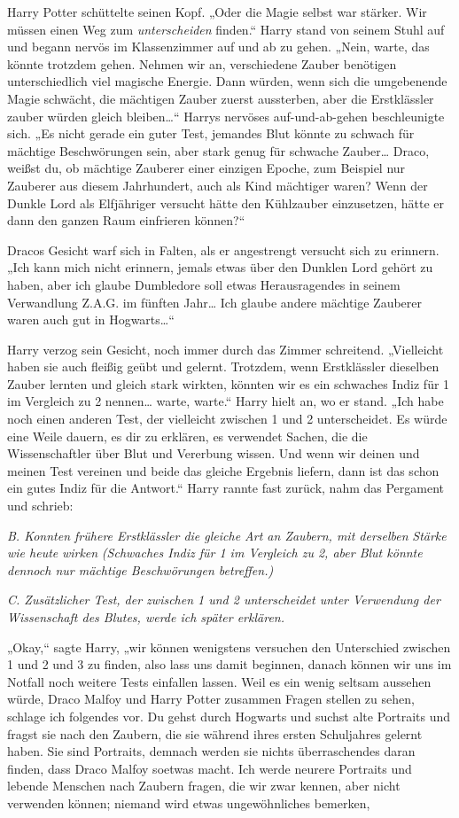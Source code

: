 {Harry Potter schüttelte seinen Kopf. „Oder die Magie selbst war stärker. Wir müssen einen Weg zum \emph{unterscheiden} finden.“ Harry stand von seinem Stuhl auf und begann nervös im Klassenzimmer auf und ab zu gehen. „Nein, warte, das könnte trotzdem gehen. Nehmen wir an, verschiedene Zauber benötigen unterschiedlich viel magische Energie. Dann würden, wenn sich die umgebenende Magie schwächt, die mächtigen Zauber zuerst aussterben, aber die Erstklässler zauber würden gleich bleiben…“ Harrys nervöses auf-und-ab-gehen beschleunigte sich. „Es nicht gerade ein guter Test, jemandes Blut könnte zu schwach für mächtige Beschwörungen sein, aber stark genug für schwache Zauber… Draco, weißst du, ob mächtige Zauberer einer einzigen Epoche, zum Beispiel nur Zauberer aus diesem Jahrhundert, auch als Kind mächtiger waren? Wenn der Dunkle Lord als Elfjähriger versucht hätte den Kühlzauber einzusetzen, hätte er dann den ganzen Raum einfrieren können?“

Dracos Gesicht warf sich in Falten, als er angestrengt versucht sich zu erinnern. „Ich kann mich nicht erinnern, jemals etwas über den Dunklen Lord gehört zu haben, aber ich glaube Dumbledore soll etwas Herausragendes in seinem Verwandlung Z.A.G. im fünften Jahr… Ich glaube andere mächtige Zauberer waren auch gut in Hogwarts…“

Harry verzog sein Gesicht, noch immer durch das Zimmer schreitend. „Vielleicht haben sie auch fleißig geübt und gelernt. Trotzdem, wenn Erstklässler dieselben Zauber lernten und gleich stark wirkten, könnten wir es ein schwaches Indiz für 1 im Vergleich zu 2 nennen… warte, warte.“ Harry hielt an, wo er stand. „Ich habe noch einen anderen Test, der vielleicht zwischen 1 und 2 unterscheidet. Es würde eine Weile dauern, es dir zu erklären, es verwendet Sachen, die die Wissenschaftler über Blut und Vererbung wissen. Und wenn wir deinen und meinen Test vereinen und beide das gleiche Ergebnis liefern, dann ist das schon ein gutes Indiz für die Antwort.“ Harry rannte fast zurück, nahm das Pergament und schrieb:

\emph{B. Konnten frühere Erstklässler die gleiche Art an Zaubern, mit derselben} \emph{Stärke wie heute} \emph{wirken} \emph{(Schwaches Indiz für 1 im Vergleich zu 2, aber Blut könnte dennoch nur mächtige Beschwörungen betreffen.)}

\emph{C. Zusätzlicher Test, der zwischen 1 und 2 unterscheidet unter Verwendung der Wissenschaft des Blutes, werde ich später erklären.}

„Okay,“ sagte Harry, „wir können wenigstens versuchen den Unterschied zwischen 1 und 2 und 3 zu finden, also lass uns damit beginnen, danach können wir uns im Notfall noch weitere Tests einfallen lassen. Weil es ein wenig seltsam aussehen würde, Draco Malfoy und Harry Potter zusammen Fragen stellen zu sehen, schlage ich folgendes vor. Du gehst durch Hogwarts und suchst alte Portraits und fragst sie nach den Zaubern, die sie während ihres ersten Schuljahres gelernt haben. Sie sind Portraits, demnach werden sie nichts überraschendes daran finden, dass Draco Malfoy soetwas macht. Ich werde neurere Portraits und lebende Menschen nach Zaubern fragen, die wir zwar kennen, aber nicht verwenden können; niemand wird etwas ungewöhnliches bemerken,

}
